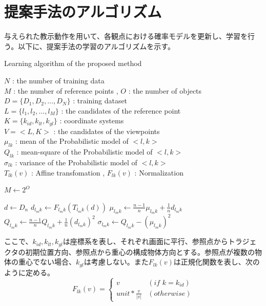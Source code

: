 ﻿\appendix
\chapter{提案手法のアルゴリズム}\label{appendix3}

与えられた教示動作を用いて、各観点における確率モデルを更新し、学習を行う。以下に、提案手法の学習のアルゴリズムを示す。
	\begin{algorithm}[h]
		\caption{ Learning algorithm of the proposed method}
		\begin{algorithmic}
			\REQUIRE
				$N$ : the number of training data \\
				$M$ : the number of reference points , 
				$O$ : the number of objects \\
				$D = \{D_{1} , D_{2} , \ldots , D_{N}\}$ : training dataset \\
				$L = \{l_{1} , l_{2} , \ldots , l_{M}\}$ : the candidates of the reference point \\
				$K = \{k_{id} , k_{lt} , k_{gl}\}$ : coordinate systems \\
				$V = <L , K>$ : the candidates of the viewpoints \\
				$μ_{lk}$ : mean of the Probabilistic model of $<l , k>$ \\
				$Q_{lk}$ : mean-square of the Probabilistic model of $<l , k>$ \\
				$σ_{lk}$ : variance of the Probabilistic model of $<l , k>$ \\
				$T_{lk}(v)$ : Affine transfomation , 
				$F_{lk}(v)$ : Normalization
		\end{algorithmic}
		\begin{algorithmic}[1]
			\STATE$M \leftarrow 2^{O}$
			
			\FOR{$n=1$ to $N$}
				\STATE $d \leftarrow D_{n}$
				\FOR{$m=1$ to $M$}
					\FOR{all $k ∈K$}
						\STATE $d_{l_{m}k} \leftarrow F_{l_{m}k}(T_{l_{m}k}(d))$
						\STATE $μ_{l_{m}k} \leftarrow \frac{n-1}{n}μ_{l_{m}k} + \frac{1}{n}d_{l_{m}k}$
						\STATE $Q_{l_{m}k} \leftarrow \frac{n-1}{n}Q_{l_{m}k} + \frac{1}{n}(d_{l_{m}k})^2$
						\STATE $σ_{l_{m}k} \leftarrow Q_{l_{m}k} - (μ_{l_{m}k})^2$
					\ENDFOR
				\ENDFOR
			\ENDFOR
		\end{algorithmic}
	\end{algorithm}
ここで、$k_{id} , k_{lt} , k_{gl}$は座標系を表し、それぞれ画面に平行、参照点からトラジェクタの初期位置方向、参照点から重心の構成物体方向とする。参照点が複数の物体の重心でない場合、$k_{gl}$は考慮しない。また$F_{lk}(v)$は正規化関数を表し、次のように定める。
\[
	F_{lk}(v) = 
	\begin{cases}
		v & (if\,\,k=k_{id}) \\
		unit * \frac{v}{|v|} & (otherwise)
	\end{cases}
\]

